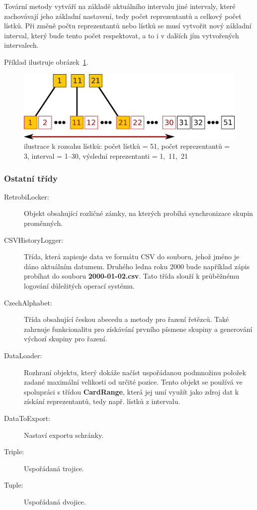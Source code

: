 Tovární metody vytváří na základě aktuálního intervalu jiné intervaly, které zachovávají jeho základní nastavení, tedy počet reprezentantů a celkový počet lístků. Při změně počtu reprezentantů nebo lístků se musí vytvořit nový základní interval, který bude tento počet respektovat, a to i v dalších jím vytvořených intervalech.

Příklad ilustruje obrázek~\ref{fig:range}.

\begin{figure}
\centering
\includegraphics[width=.7\textwidth]{range.pdf}
\caption{ilustrace k rozsahu lístků: počet lístků = 51, počet reprezentantů = 3, interval = 1--30, výslední reprezentanti = 1,~11,~21}
\label{fig:range}
\end{figure}

\subsubsection{Ostatní třídy}

\begin{description}
\item[RetrobiLocker:]{Objekt obsahující rozličné zámky, na kterých probíhá synchronizace skupin proměnných.}
\item[CSVHistoryLogger:]{Třída, která zapisuje data ve formátu CSV do souboru, jehož jméno je dáno aktuálním datumem. Druhého ledna roku 2000 bude například zápis probíhat do souboru {\bf 2000-01-02.csv}. Tato třída slouží k průběžnému logování důležitých operací systému.}
\item[CzechAlphabet:]{Třída obsahující českou abecedu a metody pro řazení řetězců. Také zahrnuje funkcionalitu pro získávání prvního písmene skupiny a generování výchozí skupiny pro řazení.}
\item[DataLoader:]{Rozhraní objektu, který dokáže načíst uspořádanou podmnožinu položek zadané maximální velikosti od určité pozice. Tento objekt se používá ve spolupráci s třídou {\bf CardRange}, která jej umí využít jako zdroj dat k získání reprezentantů, tedy např. lístků z intervalu.}
\item[DataToExport:]{Nastaví exportu schránky.}
\item[Triple:]{Uspořádaná trojice.}
\item[Tuple:]{Uspořádaná dvojice.}
\end{description}

